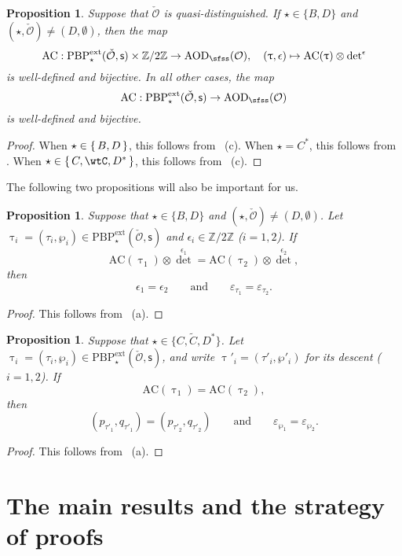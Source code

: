 \documentclass[12pt,a4paper]{amsart}
\newcommand{\CO}{{\mathcal {O}}}
\newcommand{\Z}{\mathbb{Z}}
\numberwithin{equation}{section}
\newtheorem{prop}[thm]{Proposition}
\theoremstyle{remark}
\def\PBPe{\mathrm{PBP}^{\mathrm{ext}}}
\begin{document}
\begin{prop}\label{thmac3}
Suppose that  $\check \CO$ is quasi-distinguished.  If $\star\in \{B,D\}$ and $(\star, \check \CO)\neq (D, \emptyset)$, then  the map
\[
\mathrm{AC}: \PBPe_\star(\check \CO,\mathsf s)\times \Z/2\Z \rightarrow  \mathrm{AOD}_{\sfss}(\CO),\quad (\uptau, \epsilon)\mapsto \mathrm{AC}(\uptau)\otimes {\det}^{\epsilon}
\]
is well-defined and bijective. In all other cases, the
map
\[
\mathrm{AC}: \PBPe_\star(\check \CO,\mathsf s)\rightarrow \mathrm{AOD}_{\sfss}(\CO)
\]
is well-defined and bijective.
\end{prop}
\begin{proof}
When $\star\in \set{B,D}$, this follows from ~(c).
When $\star = C^{*}$, this follows from .
When $\star\in \set{C,\wtC,D^{*}}$, this follows from ~(c).
\end{proof}

The following two propositions will also be important for us.
\begin{prop}\label{thmac4}
Suppose that  $\star\in \{B,D\}$ and $(\star, \check \CO)\neq (D, \emptyset)$. Let $\uptau_i=(\tau_i, \wp_i)\in \PBPe_\star(\check \CO,\mathsf s)$ and $\epsilon_i\in \Z/2\Z$ ($i=1,2$).   If
\[
  \mathrm{AC}(\uptau_1)\otimes {\det}^{\epsilon_1}= \mathrm{AC}(\uptau_2)\otimes {\det}^{\epsilon_2},
\]
then
\[
  \epsilon_1=\epsilon_2\qquad\textrm{and}\qquad \varepsilon_{\tau_1}=\varepsilon_{\tau_2}.
\]
 \end{prop}
\begin{proof}
  This follows from ~(a).
\end{proof}

\begin{prop}\label{thmac5}
Suppose that  $\star\in \{C,\widetilde C, D^*\}$. Let $\uptau_i=(\tau_i, \wp_i)\in \PBPe_\star(\check \CO,\mathsf s)$, and write $\uptau'_i=(\tau'_i, \wp'_i)$ for its descent ($i=1,2$).   If
\[
  \mathrm{AC}(\uptau_1)= \mathrm{AC}(\uptau_2),
\]
then
\[
 ( p_{\tau'_1}, q_{\tau'_1})=( p_{\tau'_2}, q_{\tau'_2})\qquad\textrm{and}\qquad \varepsilon_{\wp_1}=\varepsilon_{\wp_2}.
\]
 \end{prop}

\begin{proof}
  This follows from ~(a).
\end{proof}

\section{The main results and the strategy of proofs}\label{sec:main}
\end{document}
